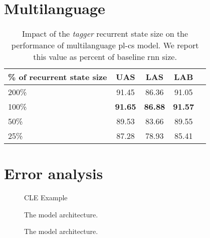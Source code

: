 \section{Multilanguage}
\begin{table}[!htbp]
    \centering
    \begin{tabular}{l c c c c}
        \% of recurrent state size & UAS & LAS & LAB \\ \hline 
        200\% & 91.45 & 86.36& 91.05 \\
        100\% & \textbf{91.65} & \textbf{86.88} & \textbf{91.57}\\
        50\% & 89.53 & 83.66 & 89.55 \\
        25\% & 87.28 & 78.93 & 85.41
    \end{tabular}
    \label{tab:birnn_multi_size}
    \caption{Impact of the \emph{tagger} recurrent state size on the performance
    of multilanguage pl-cs model.
    We report this value as percent of baseline rnn size.}
\end{table}

\section{Error analysis}

\begin{figure}[!htbp]
  \centering
  \caption{CLE Example} 
  \label{fig:cle}
\end{figure}

\begin{figure}[!htbp]
  \centering
  \caption{The model architecture.} 
  \label{fig:architecture}
\end{figure}
\begin{figure}[!htbp]
  \centering
  \caption{The model architecture.} 
  \label{fig:architecture}
\end{figure}
